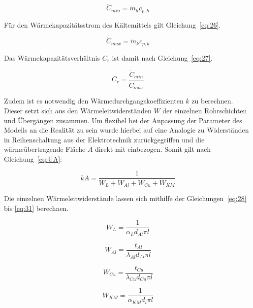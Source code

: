 \begin{equation}
\label{eq:25}
\dot{C}_{min} = \dot{m}_h c_{p,h}
\end{equation} 

Für den Wärmekapazitätsstrom des Kältemittels gilt Gleichung~\ref{eq:26}.

\begin{equation}
\label{eq:26}
\dot{C}_{max} = \dot{m}_k c_{p,k}
\end{equation}
 

Das Wärmekapazitätsverhältnis $C_r$ ist damit nach Gleichung~\ref{eq:27}.
 
\begin{equation}
\label{eq:27}
C_r = \frac{\dot{C}_{min}}{\dot{C}_{max}}
\end{equation}

Zudem ist es notwendig den Wärmedurchgangskoeffizienten $k$ zu berechnen\cite{LehrstuhlfurWarmeundStoffubertragung.}. Dieser setzt sich aus den Wärmeleitwiderständen $W$ der einzelnen Rohrschichten und Übergängen zusammen. Um flexibel bei der Anpassung der Parameter des Modells an die Realität zu sein wurde hierbei auf eine Analogie zu Widerständen in Reihenschaltung aus der Elektrotechnik zurückgegriffen und die wärmeübertragende Fläche $A$ direkt mit einbezogen. Somit gilt nach Gleichung~\ref{eq:UA}:

\begin{equation}
\label{eq:UA}
kA = \frac{1}{W_{L} + W_{Al} + W_{Cu} + W_{KM}}
\end{equation}
 
Die einzelnen Wärmeleitwiderstände lassen sich mithilfe der Gleichungen~\ref{eq:28} bis \ref{eq:31} berechnen.

\begin{equation}
\label{eq:28}
W_L = \frac{1}{\alpha_{L} d_{Al} \pi l}
\end{equation}

\begin{equation}
\label{eq:29}
W_{Al} = \frac{t_{Al}}{\lambda_{Al} d_{Al} \pi l}
\end{equation}

\begin{equation}
\label{eq:30}
W_{Cu} = \frac{t_{Cu}}{\lambda_{Cu} d_{Cu} \pi l}
\end{equation}

\begin{equation}
\label{eq:31}
W_{KM} = \frac{1}{\alpha_{KM} d_{i} \pi l}
\end{equation}

